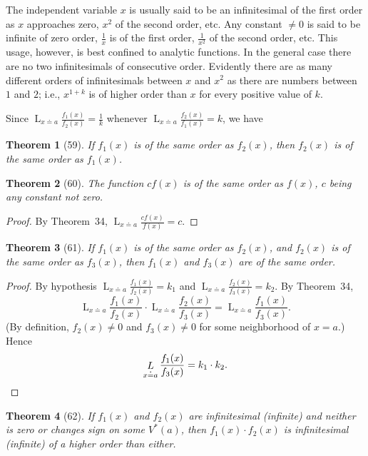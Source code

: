 \documentclass[a4paper,12pt]{book}[2004/02/16]
\providecommand{\hyperlink}[2]{#2}
\providecommand{\hypertarget}[2]{#2}
\theoremstyle{ilemma}
\theoremstyle{itheorem}
\newtheorem{theorem}{Theorem}
\theoremstyle{iother}
\theoremstyle{icorollary}
\theoremstyle{numcorollary}
\theoremstyle{idefinition}
\renewcommand{\dfrac}[2]{\frac{#1}{#2}}%
\begin{document}
The independent variable $x$ is usually said to be an infinitesimal of
the first order as $x$ approaches zero, $x^2$ of the second order,
etc. Any constant $\neq 0$ is said to be infinite of zero order,
$\dfrac{1}{x}$ is of the first order, $\dfrac{1}{x^2}$ of the second
order, etc. This usage, however, is best confined to analytic
functions. In the general case there are no two infinitesimals of
consecutive order. Evidently there are as many different orders of
infinitesimals between $x$ and $x^2$ as there are numbers between $1$
and $2$; i.e., $x^{1+k}$ is of higher order than $x$ for every
positive value of $k$.

Since $\displaystyle\mathop{L}_{x\doteq
a}\frac{f_1(x)}{f_2(x)}=\frac1k$ whenever
$\displaystyle\mathop{L}_{x\doteq a}\frac{f_2(x)}{f_1(x)}=k$, we have
\begin{theorem}[59]\hypertarget{thm59}{}
If $f_1(x)$ is of the same order as $f_2(x)$, then $f_2(x)$ is of the
same order as $f_1(x)$.
\end{theorem}
\begin{theorem}[60]\hypertarget{thm60}{}
The function $cf(x)$ is of the same order as $f(x)$, $c$ being any
constant not zero.
\end{theorem}
\begin{proof}
By Theorem~\hyperlink{thm34}{34}, $\displaystyle\mathop{L}_{x\doteq
a}\frac{cf(x)}{f(x)}=c$.
\end{proof}
\begin{theorem}[61]\hypertarget{thm61}{}
If $f_1(x)$ is of the same order as $f_2(x)$, and $f_2(x)$ is of the
same order as $f_3(x)$, then $f_1(x)$ and $f_3(x)$ are of the same
order.
\end{theorem}

\begin{proof}
By hypothesis
$\displaystyle\mathop{L}_{x \doteq a} \frac{f_1(x)}{f_2(x)}=k_1$ and
$\displaystyle\mathop{L}_{x \doteq a} \frac{f_2(x)}{f_3(x)}=k_2$.
By Theorem~\hyperlink{thm34}{34},
\[
 \displaystyle\mathop{L}_{x \doteq a} \frac{f_1(x)}{f_2(x)} \cdot
 \mathop{L}_{x \doteq a} \frac{f_2(x)}{f_3(x)} =
 \mathop{L}_{x \doteq a} \frac{f_1(x)}{f_3(x)}.
\]
(By definition, $f_2(x) \neq 0$ and $f_3(x)\neq 0$ for some
neighborhood of $x=a$.) Hence
\[
  \mathop{L}_{x \doteq a} \frac{f_1(x)}{f_3(x)} = k_1 \cdot k_2.\qedhere
\]
\end{proof}

\begin{theorem}[62]\hypertarget{thm62}{}
If $f_1(x)$ and $f_2(x)$ are infinitesimal (infinite) and neither is
zero or changes sign on some $V^*(a)$, then $f_1(x)\cdot f_2(x)$ is
infinitesimal (infinite) of a higher order than either.
\end{theorem}
\end{document}
